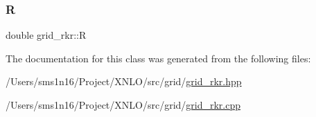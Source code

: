 \mbox{\label{classgrid__rkr_a2da8ae00c520a66c9cac2784a2149dcb}} 
\subsubsection{\texorpdfstring{R}{R}}
{\footnotesize\ttfamily double grid\+\_\+rkr\+::R}



The documentation for this class was generated from the following files\+:\begin{DoxyCompactItemize}
\item 
/\+Users/sms1n16/\+Project/\+X\+N\+L\+O/src/grid/\mbox{\hyperlink{grid__rkr_8hpp}{grid\+\_\+rkr.\+hpp}}\item 
/\+Users/sms1n16/\+Project/\+X\+N\+L\+O/src/grid/\mbox{\hyperlink{grid__rkr_8cpp}{grid\+\_\+rkr.\+cpp}}\end{DoxyCompactItemize}
